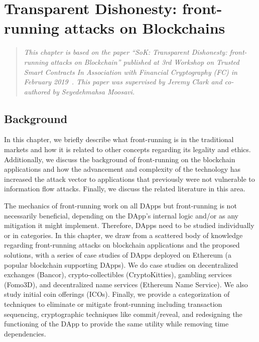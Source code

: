 

\chapter{Transparent Dishonesty: front-running attacks on Blockchains} \label{sec:frontrunning}




\begin{quote}
	\textit{This chapter is based on the paper ``SoK: Transparent Dishonesty: front-running attacks on Blockchain'' published at 3rd Workshop on Trusted Smart Contracts In Association with Financial Cryptography (FC) in February 2019~\cite{eskandari2019sok}. This paper was supervised by Jeremy Clark and co-authored by Seyedehmahsa Moosavi.}
\end{quote}


\section{Background}

In this chapter, we briefly describe what front-running is in the traditional markets and how it is related to other concepts regarding its legality and ethics. Additionally, we discuss the background of front-running on the blockchain applications and how the advancement and complexity of the technology has increased the attack vector to applications that previously were not vulnerable to information flow attacks. Finally, we discuss the related literature in this area. 




The mechanics of front-running work on all DApps but front-running is not necessarily beneficial, depending on the DApp's internal logic and/or as any mitigation it might implement. Therefore, DApps need to be studied individually or in categories. In this chapter, we draw from a scattered body of knowledge regarding front-running attacks on blockchain applications and the proposed solutions, with a series of case studies of DApps deployed on Ethereum (a popular blockchain supporting DApps). We do case studies on decentralized exchanges (\eg Bancor), crypto-collectibles (\eg CryptoKitties), gambling services (\eg Fomo3D), and decentralized name services (\eg Ethereum Name Service). We also study initial coin offerings (ICOs). Finally, we provide a categorization of techniques to eliminate or mitigate front-running including transaction sequencing, cryptographic techniques like commit/reveal, and redesigning the functioning of the DApp to provide the same utility while removing time dependencies.



